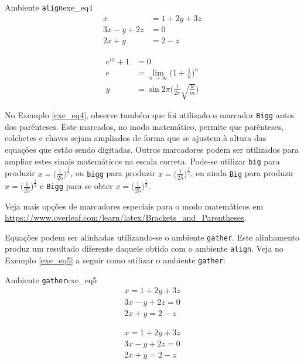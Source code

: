 \begin{texexptitled}[breakable,center lower,enhanced,middle=2mm]{Ambiente {\tt align}}{exe_eq4}
\begin{align*}
 x           & = 1 + 2y + 3z \\ 
3x -  y + 2z & = 0           \\
2x +  y      & = 2 - z
\end{align*}

\begin{align}
e^{i\pi} + 1 & = 0                                           \\
e & = \lim_{n \to \infty}{\Bigg(1 + \frac{1}{n}\Bigg)^{n}}   \\
y & = \sin 2\pi \Bigg(\frac{1}{2\pi}\sqrt{\frac{k}{m}}\Bigg)
\end{align}
\end{texexptitled}

No Exemplo \ref{exe_eq4}, observe também que foi utilizado o marcador {\tt Bigg} antes dos parênteses. Este marcados, no modo matemático, permite que parênteses, colchetes e chaves sejam ampliados de forma que se ajustem à altura das equações que estão sendo digitadas. Outros marcadores podem ser utilizados para ampliar estes sinais matemáticos na escala correta. Pode-se utilizar {\tt big} para produzir $x=\big(\frac{1}{25}\big)^{\frac{1}{2}}$, ou {\tt bigg} para produzir $x=\bigg(\frac{1}{25}\bigg)^{\frac{1}{2}}$, ou ainda {\tt Big} para produzir $x=\Big(\frac{1}{25}\Big)^{\frac{1}{2}}$ e {\tt Bigg} para se obter $x=\Bigg(\frac{1}{25}\Bigg)^{\frac{1}{2}}$.

\begin{marker}
Veja mais opções de marcadores especiais para o modo matemáticos em \url{https://www.overleaf.com/learn/latex/Brackets_and_Parentheses}.
\end{marker}

Equações podem ser alinhadas utilizando-se o ambiente {\tt gather}. Este alinhamento produz um resultado diferente daquele obtido com o ambiente {\tt align}. Veja no Exemplo \ref{exe_eq5} a seguir como utilizar o ambiente {\tt gather}:

\begin{texexptitled}[breakable,center lower,enhanced,middle=2mm]{Ambiente {\tt gather}}{exe_eq5}
\begin{gather*}
 x           = 1 + 2y + 3z \\ 
3x -  y + 2z = 0           \\
2x +  y      = 2 - z
\end{gather*}

\begin{gather}
 x           = 1 + 2y + 3z \\ 
3x -  y + 2z = 0           \\
2x +  y      = 2 - z
\end{gather}
\end{texexptitled}

